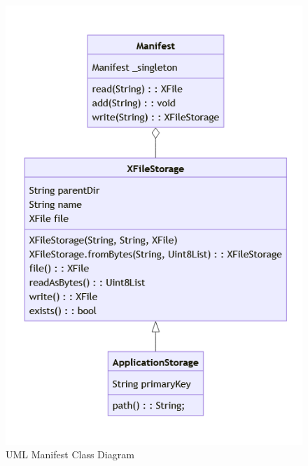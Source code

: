 \documentclass [11pt, proquest] {uwthesis}[2020/02/24]
\begin{document}
\begin{figure}
  \centering
  \includegraphics[width=\textwidth,height=0.8\textheight,keepaspectratio]{Appendix/Figures/manifestClass.png}
  \caption{UML Manifest Class Diagram}
  \label{fig:appendix_manifestClass}
\end{figure}
\end{document}
